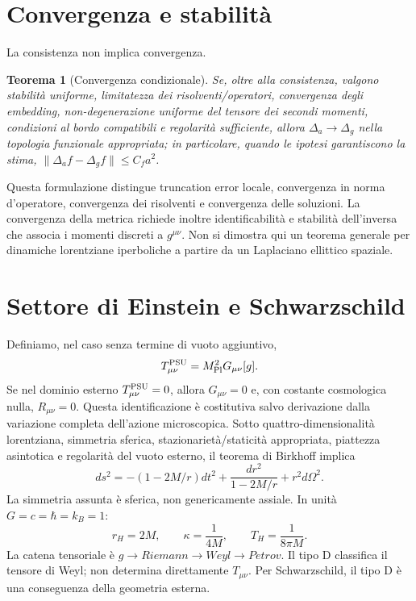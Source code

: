 \documentclass[11pt,a4paper]{article}
\newtheorem{theorem}{Teorema}[section]\newtheorem{lemma}[theorem]{Lemma}\newtheorem{proposition}[theorem]{Proposizione}\newtheorem{corollary}[theorem]{Corollario}\newtheorem{remark}[theorem]{Osservazione}
\begin{document}
\section{Convergenza e stabilità}
La consistenza non implica convergenza.\begin{theorem}[Convergenza condizionale]\label{thm:conv}Se, oltre alla consistenza, valgono stabilità uniforme, limitatezza dei risolventi/operatori, convergenza degli embedding, non-degenerazione uniforme del tensore dei secondi momenti, condizioni al bordo compatibili e regolarità sufficiente, allora $\Delta_a\to\Delta_g$ nella topologia funzionale appropriata; in particolare, quando le ipotesi garantiscono la stima, $\|\Delta_af-\Delta_gf\|\le C_fa^2$.
\end{theorem}
Questa formulazione distingue truncation error locale, convergenza in norma d'operatore, convergenza dei risolventi e convergenza delle soluzioni. La convergenza della metrica richiede inoltre identificabilità e stabilità dell'inversa che associa i momenti discreti a $g^{\mu\nu}$. Non si dimostra qui un teorema generale per dinamiche lorentziane iperboliche a partire da un Laplaciano ellittico spaziale.
\section{Settore di Einstein e Schwarzschild}
Definiamo, nel caso senza termine di vuoto aggiuntivo,
\begin{equation}T_{\mu\nu}^{\rm PSU}=M_{\rm Pl}^2G_{\mu\nu}[g].\end{equation}
Se nel dominio esterno $T_{\mu\nu}^{\rm PSU}=0$, allora $G_{\mu\nu}=0$ e, con costante cosmologica nulla, $R_{\mu\nu}=0$. Questa identificazione è costitutiva salvo derivazione dalla variazione completa dell'azione microscopica.
Sotto quattro-dimensionalità lorentziana, simmetria sferica, stazionarietà/staticità appropriata, piattezza asintotica e regolarità del vuoto esterno, il teorema di Birkhoff implica
\begin{equation}\label{eq:schw}ds^2=-(1-2M/r)dt^2+\frac{dr^2}{1-2M/r}+r^2d\Omega^2.\end{equation}
La simmetria assunta è sferica, non genericamente assiale. In unità $G=c=\hbar=k_B=1$:
\begin{equation}r_H=2M,\qquad\kappa=\frac1{4M},\qquad T_H=\frac1{8\pi M}.\end{equation}
La catena tensoriale è $g\to Riemann\to Weyl\to Petrov$. Il tipo D classifica il tensore di Weyl; non determina direttamente $T_{\mu\nu}$. Per Schwarzschild, il tipo D è una conseguenza della geometria esterna.
\end{document}
